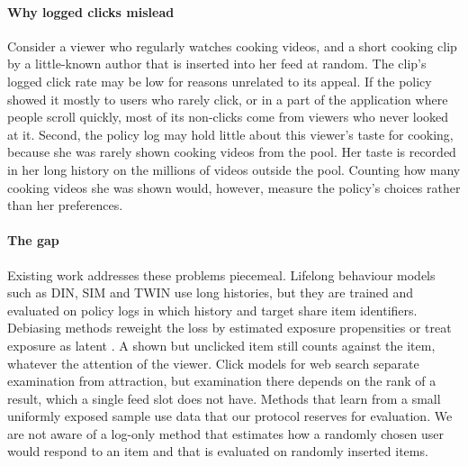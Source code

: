 \documentclass[preprint,12pt,authoryear]{elsarticle}
\begin{document}
\paragraph{Why logged clicks mislead} Consider a viewer who regularly watches cooking videos, and a short cooking clip by a
little-known author that is inserted into her feed at random. The clip's logged click rate may be low for reasons unrelated to
its appeal. If the policy showed it mostly to users who rarely click, or in a part of the application where people scroll quickly,
most of its non-clicks come from viewers who never looked at it. Second, the policy log may hold little about this viewer's taste for
cooking, because she was rarely shown cooking videos from the pool. Her taste is recorded in her long history on the millions of
videos outside the pool. Counting how many cooking videos she was shown would, however, measure the policy's choices rather than
her preferences.

\paragraph{The gap} Existing work addresses these problems piecemeal. Lifelong behaviour models such as DIN, SIM and TWIN
\citep{zhou2018din,pi2020sim,chang2023twin} use long histories, but they are trained and evaluated on policy logs in which history
and target share item identifiers. Debiasing methods reweight the loss by estimated exposure propensities
\citep{saito2020unbiased,joachims2017unbiased} or treat exposure as latent \citep{liang2016exposure}. A shown but unclicked item still
counts against the item, whatever the attention of the viewer. Click models for web search \citep{richardson2007predicting,
craswell2008cascade,chuklin2015clickmodels} separate examination from attraction, but examination there depends on the rank of
a result, which a single feed slot does not have. Methods that learn from a small uniformly exposed sample
\citep{chen2021autodebias} use data that our protocol reserves for evaluation. We are not aware of a log-only method that estimates
how a randomly chosen user would respond to an item and that is evaluated on randomly inserted items.
\end{document}
